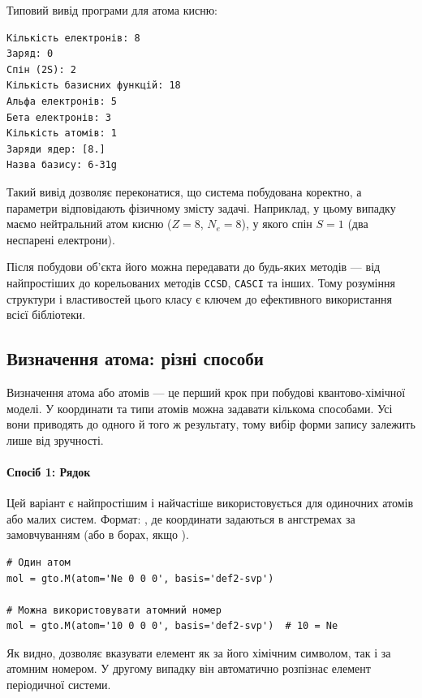 \noindent
Типовий вивід програми для атома кисню:
\begin{verbatim}
Кількість електронів: 8
Заряд: 0
Спін (2S): 2
Кількість базисних функцій: 18
Альфа електронів: 5
Бета електронів: 3
Кількість атомів: 1
Заряди ядер: [8.]
Назва базису: 6-31g
\end{verbatim}

Такий вивід дозволяє переконатися, що система побудована коректно, а параметри відповідають фізичному змісту задачі.
Наприклад, у цьому випадку маємо нейтральний атом кисню ($Z=8$, $N_e=8$), у якого спін $S=1$ (два неспарені електрони).

Після побудови об’єкта  його можна передавати до будь-яких методів \PySCF{} --- від найпростіших  до корельованих методів \texttt{CCSD}, \texttt{CASCI} та інших.
Тому розуміння структури і властивостей цього класу є ключем до ефективного використання всієї бібліотеки.

\subsection{Визначення атома: різні способи}

Визначення атома або атомів --- це перший крок при побудові квантово-хімічної моделі.
У \PySCF{} координати та типи атомів можна задавати кількома способами.
Усі вони приводять до одного й того ж результату, тому вибір форми запису залежить лише від зручності.

\paragraph{Спосіб 1: Рядок}

Цей варіант є найпростішим і найчастіше використовується для одиночних атомів або малих систем.
Формат: , де координати задаються в ангстремах за замовчуванням (або в борах, якщо ).

\begin{verbatim}
# Один атом
mol = gto.M(atom='Ne 0 0 0', basis='def2-svp')

# Можна використовувати атомний номер
mol = gto.M(atom='10 0 0 0', basis='def2-svp')  # 10 = Ne
\end{verbatim}

Як видно, \PySCF{} дозволяє вказувати елемент як за його хімічним символом, так і за атомним номером.
У другому випадку він автоматично розпізнає елемент періодичної системи.

